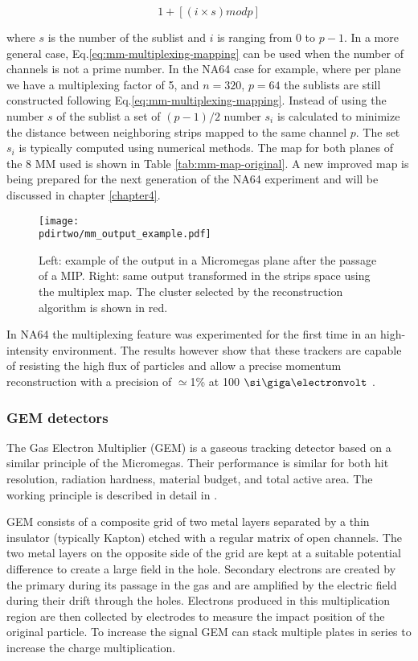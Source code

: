 \begin{equation}
\label{eq:mm-multiplexing-mapping}
1 + [(i \times s) mod p]
\end{equation}

where $s$ is the number of the sublist and $i$ is ranging from 0 to $p-1$. In a more general case, Eq.\ref{eq:mm-multiplexing-mapping} can be used when the number of channels is not a prime number. In the NA64 case for example, where per plane we have a multiplexing factor of 5, and $n=320$, $p=64$ the sublists are still constructed following Eq.\ref{eq:mm-multiplexing-mapping}. Instead of using the number $s$ of the sublist a set of $(p-1)/2$ number $s_i$ is calculated to minimize the distance between neighboring strips mapped to the same channel $p$. The set $s_i$ is typically computed using numerical methods. The map for both planes of the 8 MM used is shown in Table \ref{tab:mm-map-original}. A new improved map is being prepared for the next generation of the NA64 experiment and will be discussed in chapter \ref{chapter4}.

\begin{figure}[bth!]
  \centering
  \texttt{[image: \\pdirtwo/mm\_output\_example.pdf]}
\caption[example of the readout of a multiplexing detector]{Left: example of the output in a Micromegas plane after the passage of a MIP. Right: same output transformed in the strips space using the multiplex map. The cluster selected by the reconstruction algorithm is shown in red.}
\label{fig:multiplexing-example}
\end{figure}

In NA64 the multiplexing feature was experimented for the first time in an high-intensity environment. The results however show that these trackers are capable of resisting the high flux of particles and allow a precise momentum reconstruction with a precision of $\simeq$1\% at 100 $\gev$ \cite{Banerjee:2017mdu}.

\subsubsection{GEM detectors}
\label{ch2:sec:gem}
The Gas Electron Multiplier (GEM) is a gaseous tracking detector based on a similar principle of the Micromegas. Their performance is similar for both hit resolution, radiation hardness, material budget, and total active area. The working principle is described in detail in \cite{gem,SAULI20162,ABBON2007455}.

GEM consists of a composite grid of two metal layers separated by a thin insulator (typically Kapton) etched with a regular matrix of open channels. The two metal layers on the opposite side of the grid are kept at a suitable potential difference to create a large field in the hole. Secondary electrons are created by the primary during its passage in the gas and are amplified by the electric field during their drift through the holes. Electrons produced in this multiplication region are then collected by electrodes to measure the impact position of the original particle. To increase the signal GEM can stack multiple plates in series to increase the charge multiplication.

